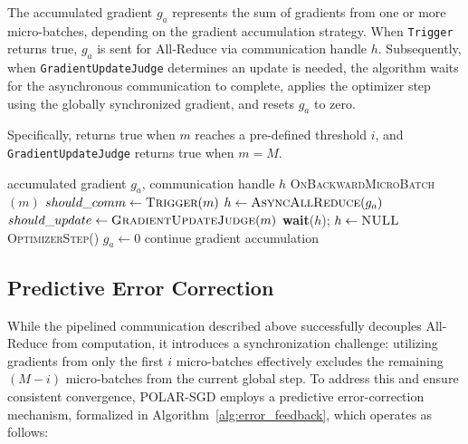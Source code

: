The accumulated gradient $g_a$ represents the sum of gradients from one or more micro-batches, depending on the gradient accumulation strategy. When \texttt{Trigger} returns true, $g_a$ is sent for All-Reduce via communication handle $h$. Subsequently, when \texttt{GradientUpdateJudge} determines an update is needed, the algorithm waits for the asynchronous communication to complete, applies the optimizer step using the globally synchronized gradient, and resets $g_a$ to zero. 

Specifically,  returns true when $m$ reaches a pre-defined threshold $i$, and \texttt{GradientUpdateJudge} returns true when $m = M$.


\begin{algorithm}[tb]
  \caption{Pipelined Gradient Communication in DP+PP Training}
  \label{alg:communication}
  \begin{algorithmic}
     accumulated gradient $g_a$, communication handle $h$
     \textsc{OnBackwardMicroBatch}$(m)$
    \STATE $should\_comm \leftarrow \textsc{Trigger}(m)$
      \STATE $h \leftarrow \textsc{AsyncAllReduce}(g_a)$
    \ENDIF
    \STATE $should\_update \leftarrow \textsc{GradientUpdateJudge}(m)$
        \STATE \textbf{wait}($h$); $h \leftarrow \textsc{NULL}$
      \ENDIF
      \STATE \textsc{OptimizerStep}()
      \STATE $g_a \leftarrow 0$
    \ELSE
      \STATE continue gradient accumulation
    \ENDIF
  \end{algorithmic}
\end{algorithm}


\subsection{Predictive Error Correction}

While the pipelined communication described above successfully decouples All-Reduce from computation, it introduces a synchronization challenge: utilizing gradients from only the first $i$ micro-batches effectively excludes the remaining $(M-i)$ micro-batches from the current global step. To address this and ensure consistent convergence, POLAR-SGD employs a predictive error-correction mechanism, formalized in Algorithm~\ref{alg:error_feedback}, which operates as follows:

